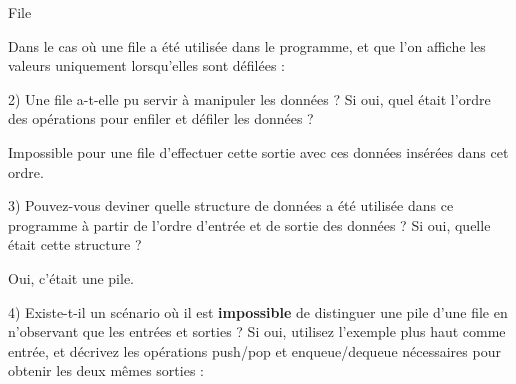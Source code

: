 \documentclass[11pt,a4paper]{article}
\begin{document}
\begin{center}
\begin{table}[ht!]
\begin{minipage}{0.01\textwidth}

  \end{minipage}
  \hfillx
  \begin{minipage}{0.48\textwidth}
    \centering
File

Dans le cas où une file a été utilisée dans le programme, et que l'on affiche les valeurs uniquement lorsqu'elles sont défilées :

\smallskip

\raggedright
2) Une file a-t-elle pu servir à manipuler les données ?
Si oui, quel était l'ordre des opérations pour enfiler et défiler les données ? \phantom{blablabla}

\bigskip
\bigskip

Impossible pour une file d'effectuer cette sortie avec ces données insérées dans cet ordre.



  \end{minipage}
\end{table}

\end{center}


3) Pouvez-vous deviner quelle structure de données a été utilisée dans ce programme à partir de l'ordre d'entrée et de sortie des données ?
Si oui, quelle était cette structure ?

\bigskip

Oui, c'était une pile.

\bigskip


\marginpar{1.5 pt}


4) Existe-t-il un scénario où il est \textbf{impossible} de distinguer une pile d'une file en n'observant que les entrées et sorties ?
Si oui, utilisez l'exemple plus haut comme entrée, et décrivez les opérations push/pop et enqueue/dequeue nécessaires pour obtenir les deux mêmes sorties :
\end{document}
